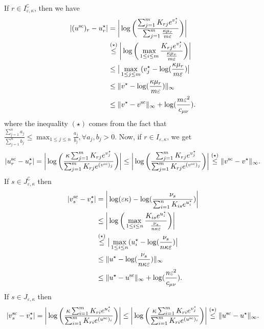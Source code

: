If $r \in I^\complement_{\varepsilon, \kappa}$, then we have 
\begin{align*}
|({u}^{\text{sc}})_{r} - {u}^\star_r| 
&= \bigg|\log\bigg(\frac{\sum_{j=1}^m K_{rj}e^{v^\star_j}}{\sum_{j=1}^m \frac{\kappa \mu_r}{m\varepsilon}}\bigg) \bigg|\\
& \overset{(\star)}{\leq} \bigg|\log\bigg(\max_{1\leq i \leq m} \frac{K_{rj}e^{v^\star_j}}{\frac{\kappa \mu_r}{m\varepsilon}}\bigg) \bigg|\\
& \leq \big|\max_{1\leq j \leq m} (v_j^\star - \log(\frac{\kappa \mu_r}{m\varepsilon})\big|\\
& \leq \|v^\star - \log(\frac{\kappa \mu_r}{m\varepsilon})\|_\infty \\
& \leq \|v^\star - {v}^{\text{sc}}\|_\infty + \log(\frac{m\varepsilon^2}{c_{\mu\nu}}).
\end{align*}
where the inequality $(\star)$ comes from the fact that $\frac{\sum_{j=1}^na_j}{\sum_{j=1}^nb_{j}} \leq \max_{1\leq j \leq n} \frac{a_j}{b_j}, \forall a_j, b_j>0.$
Now, if $r \in I_{\varepsilon, \kappa}$, we get 
\begin{align*}
|{u}^{\text{sc}}_{r} - {u}^\star_r|
= \bigg|\log\bigg(\frac{\kappa\sum_{j=1}^m K_{rj}e^{v^\star_j}}{\sum_{j=1}^m K_{rj}e^{(v^{\text{sc}})_j}}\bigg)\bigg|
\leq \bigg|\log\bigg(\frac{\sum_{j=1}^m K_{rj}e^{v^\star_j}}{\sum_{j=1}^m K_{rj}e^{(v^{\text{sc}})_j}}\bigg)\bigg|
\overset{(\star)}{\leq}\|v^{\text{sc}} - v^\star\|_\infty.
\end{align*}
If $s \in J^\complement_{\varepsilon, \kappa}$ then 
\begin{align*}
|{v}^{\text{sc}}_{s} - {v}^\star_s| &= \bigg| \log(\varepsilon\kappa) - \log(\frac{\nu_s}{\sum_{i=1}^n K_{is}e^{u^\star_i}})\bigg|\\
& \leq \bigg|\log\bigg(\max_{1\leq i \leq n} \frac{K_{is}e^{u^\star_i}}{\frac{\nu_s}{n\kappa\varepsilon}}\bigg) \bigg|\\
& \overset{(\star)}{\leq} \big|\max_{1\leq i \leq n} (u_i^\star - \log(\frac{\nu_s}{n\kappa\varepsilon})\big|\\
& \leq \|u^\star - \log(\frac{\nu_s}{n\kappa\varepsilon})\|_\infty \\
& \leq \|u^\star - u^{\text{sc}}\|_\infty +  \log(\frac{n\varepsilon^2}{c_{\mu\nu}}).
\end{align*}
If $s \in J_{\varepsilon, \kappa}$ then 
\begin{align*}
|{v}^{\text{sc}}_{s} - {v}^\star_s| 
= \bigg|\log\bigg(\frac{\kappa\sum_{i=1}^m K_{ri}e^{u^\star_i}}{\sum_{i=1}^m K_{ri}e^{(u^{\text{sc}})_i}}\bigg)\bigg|
 \leq \bigg|\log\bigg(\frac{\kappa\sum_{i=1}^m K_{ri}e^{v^\star_j}}{\sum_{i=1}^m K_{ri}e^{(u^{\text{sc}})_i}}\bigg)\bigg|
\overset{(\star)}{\leq} \|u^{\text{sc}} - u^\star\|_\infty.
\end{align*}
